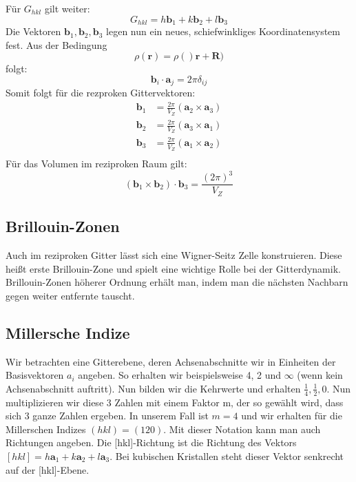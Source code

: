 \documentclass[11pt]{article}
\begin{document}
Für $G_{hkl}$ gilt weiter:
\begin{equation}
  G_{hkl}=h\bm{b}_1+k\bm{b}_2+l\bm{b}_3
\end{equation}
Die Vektoren $\bm{b}_1, \bm{b}_2, \bm{b}_3$ legen nun ein neues,
schiefwinkliges Koordinatensystem fest. Aus der Bedingung
\begin{equation}
  \rho(\bm{r})=\rho()\bm{r}+\bm{R})
\end{equation}
folgt:
\begin{equation}
  \bm{b}_i\cdot\bm{a}_j=2\pi\delta_{ij}
\end{equation}
Somit folgt für die rezproken Gittervektoren:
\begin{equation}
  \begin{align}
    \bm{b}_1&=\frac{2\pi}{V_Z}(\bm{a}_2\times\bm{a}_3) \\
    \bm{b}_2&=\frac{2\pi}{V_Z}(\bm{a}_3\times\bm{a}_1) \\
    \bm{b}_3&=\frac{2\pi}{V_Z}(\bm{a}_1\times\bm{a}_2) \\
  \end{align}
\end{equation}
Für das Volumen im reziproken Raum gilt:
\begin{equation}
  (\bm{b}_1\times\bm{b}_2)\cdot\bm{b}_3=\frac{(2\pi)^3}{V_Z}
\end{equation}
\subsection{Brillouin-Zonen}
Auch im reziproken Gitter lässt sich eine Wigner-Seitz Zelle konstruieren.
Diese heißt erste Brillouin-Zone und spielt eine wichtige Rolle bei der
Gitterdynamik. Brillouin-Zonen höherer Ordnung erhält man, indem man die
nächsten Nachbarn gegen weiter entfernte tauscht.
\subsection{Millersche Indize}
Wir betrachten eine Gitterebene, deren Achsenabschnitte wir in Einheiten
der Basisvektoren $a_i$ angeben. So erhalten wir beispielsweise 4, 2 und $\infty$
(wenn kein Achsenabschnitt auftritt). Nun bilden wir die Kehrwerte und erhalten
$\frac{1}{4}, \frac{1}{2}, 0$. Nun multiplizieren wir diese 3 Zahlen mit einem
Faktor m, der so gewählt wird, dass sich 3 ganze Zahlen ergeben. In unserem
Fall ist $m=4$ und wir erhalten für die Millerschen Indizes $(hkl)= (120)$. Mit
dieser Notation kann man auch Richtungen angeben. Die [hkl]-Richtung ist die
Richtung des Vektors $[hkl]=h\bm{a}_1+k\bm{a}_2+l\bm{a}_3$. Bei kubischen
Kristallen steht dieser Vektor senkrecht auf der [hkl]-Ebene.
\end{document}

